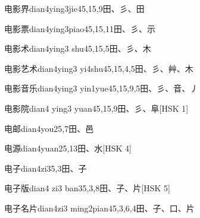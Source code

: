 \begin{entry}{电影界}{dian4ying3jie4}{5,15,9}{⽥、⼺、⽥}
\end{entry}

\begin{entry}{电影票}{dian4ying3piao4}{5,15,11}{⽥、⼺、⽰}
\end{entry}

\begin{entry}{电影术}{dian4ying3 shu4}{5,15,5}{⽥、⼺、⽊}
\end{entry}

\begin{entry}{电影艺术}{dian4ying3 yi4shu4}{5,15,4,5}{⽥、⼺、⾋、⽊}
\end{entry}

\begin{entry}{电影音乐}{dian4ying3 yin1yue4}{5,15,9,5}{⽥、⼺、⾳、⼃}
\end{entry}

\begin{entry}{电影院}{dian4 ying3 yuan4}{5,15,9}{⽥、⼺、⾩}[HSK 1]
\end{entry}

\begin{entry}{电邮}{dian4you2}{5,7}{⽥、⾢}
\end{entry}

\begin{entry}{电源}{dian4yuan2}{5,13}{⽥、⽔}[HSK 4]
\end{entry}

\begin{entry}{电子}{dian4zi3}{5,3}{⽥、⼦}
\end{entry}

\begin{entry}{电子版}{dian4 zi3 ban3}{5,3,8}{⽥、⼦、⽚}[HSK 5]
\end{entry}

\begin{entry}{电子名片}{dian4zi3 ming2pian4}{5,3,6,4}{⽥、⼦、⼝、⽚}
\end{entry}

